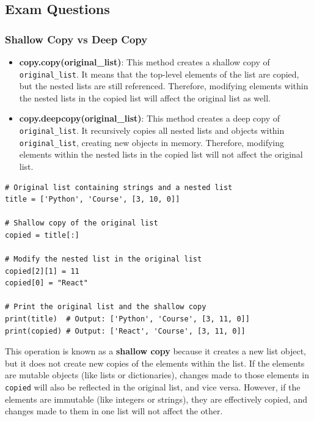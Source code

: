 \subsection{Exam Questions}

\subsubsection{Shallow Copy vs Deep Copy}
\begin{itemize}
    \item \textbf{copy.copy(original\_list)}: This method creates a shallow copy of \texttt{original\_list}. It means that the top-level elements of the list are copied, but the nested lists are still referenced. Therefore, modifying elements within the nested lists in the copied list will affect the original list as well.
    
    \item \textbf{copy.deepcopy(original\_list)}: This method creates a deep copy of \texttt{original\_list}. It recursively copies all nested lists and objects within \texttt{original\_list}, creating new objects in memory. Therefore, modifying elements within the nested lists in the copied list will not affect the original list.
\end{itemize}

\begin{codebox}
\begin{verbatim}
# Original list containing strings and a nested list
title = ['Python', 'Course', [3, 10, 0]]

# Shallow copy of the original list
copied = title[:]

# Modify the nested list in the original list
copied[2][1] = 11
copied[0] = "React"

# Print the original list and the shallow copy
print(title)  # Output: ['Python', 'Course', [3, 11, 0]]
print(copied) # Output: ['React', 'Course', [3, 11, 0]]
\end{verbatim}
\end{codebox}

This operation is known as a \textbf{shallow copy} because it creates a new list object, but it does not create new copies of the elements within the list. If the elements are mutable objects (like lists or dictionaries), changes made to those elements in \texttt{copied} will also be reflected in the original list, and vice versa. However, if the elements are immutable (like integers or strings), they are effectively copied, and changes made to them in one list will not affect the other.

